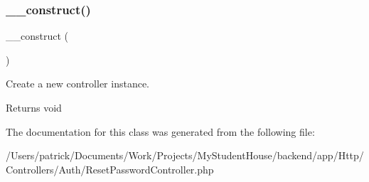 \subsubsection{\texorpdfstring{\_\_construct()}{\_\_construct()}}
{\footnotesize\ttfamily \+\_\+\+\_\+construct (\begin{DoxyParamCaption}{ }\end{DoxyParamCaption})}

Create a new controller instance.

\begin{DoxyReturn}{Returns}
void 
\end{DoxyReturn}


The documentation for this class was generated from the following file\+:\begin{DoxyCompactItemize}
\item 
/\+Users/patrick/\+Documents/\+Work/\+Projects/\+My\+Student\+House/backend/app/\+Http/\+Controllers/\+Auth/Reset\+Password\+Controller.\+php\end{DoxyCompactItemize}
